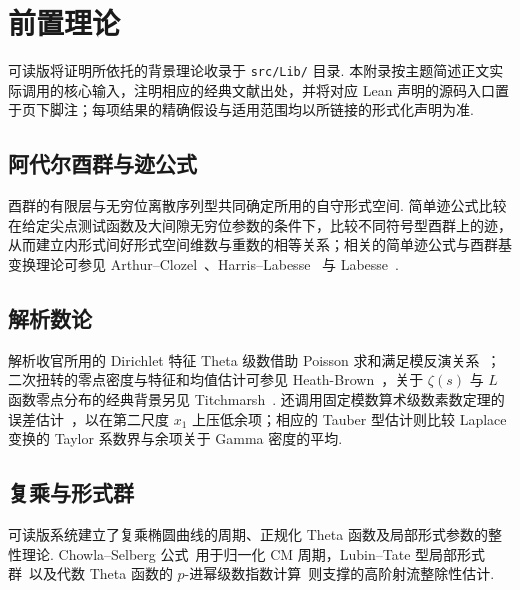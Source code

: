 \chapter{前置理论}
\label{app:lib-overview}

可读版将证明所依托的背景理论收录于 \texttt{src/Lib/} 目录. 本附录按主题简述正文实际调用的核心输入，注明相应的经典文献出处，并将对应 Lean 声明的源码入口置于页下脚注；每项结果的精确假设与适用范围均以所链接的形式化声明为准.

\section{阿代尔酉群与迹公式}

酉群的有限层与无穷位离散序列型共同确定所用的自守形式空间. 简单迹公式比较在给定尖点测试函数及大间隙无穷位参数的条件下，比较不同符号型酉群上的迹，从而建立内形式间好形式空间维数与重数的相等关系；相关的简单迹公式与酉群基变换理论可参见 Arthur--Clozel~\cite{ArthurClozel1989}、Harris--Labesse~\cite{HarrisLabesse2004} 与 Labesse~\cite{Labesse2011}.

\section{解析数论}

解析收官所用的 Dirichlet 特征 Theta 级数借助 Poisson 求和满足模反演关系~\cite{Davenport2000,IwaniecKowalski2004,MontgomeryVaughan2007}；二次扭转的零点密度与特征和均值估计可参见 Heath-Brown~\cite{HeathBrown1995}，关于 $\zeta(s)$ 与 $L$ 函数零点分布的经典背景另见 Titchmarsh~\cite{Titchmarsh1986}. 还调用固定模数算术级数素数定理的误差估计~\cite{MontgomeryVaughan2007}，以在第二尺度 $x_1$ 上压低余项；相应的 Tauber 型估计则比较 Laplace 变换的 Taylor 系数界与余项关于 Gamma 密度的平均.

\section{复乘与形式群}

可读版系统建立了复乘椭圆曲线的周期、正规化 Theta 函数及局部形式参数的整性理论. Chowla--Selberg 公式~\cite{SelbergChowla1967}用于归一化 CM 周期，Lubin--Tate 型局部形式群~\cite{LubinTate1965}以及代数 Theta 函数的 $p$-进幂级数指数计算~\cite{BannaiKobayashi2010}则支撑的高阶射流整除性估计.

